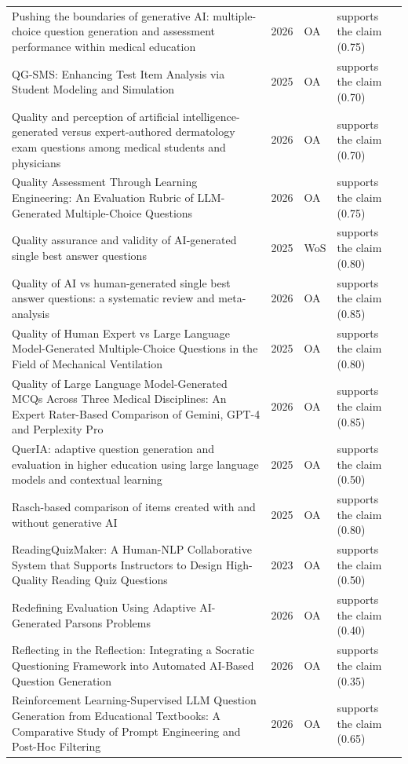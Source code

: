 \begin{longtable}{@{}%
  >{\raggedright\arraybackslash}p{}c%
  >{\raggedright\arraybackslash}p{}%
  >{\raggedright\arraybackslash}p{}@{}}
Pushing the boundaries of generative AI: multiple-choice question generation and assessment performance within medical education & 2026 & OA & supports the claim (0.75) \\
QG-SMS: Enhancing Test Item Analysis via Student Modeling and Simulation & 2025 & OA & supports the claim (0.70) \\
Quality and perception of artificial intelligence-generated versus expert-authored dermatology exam questions among medical students and physicians & 2026 & OA & supports the claim (0.70) \\
Quality Assessment Through Learning Engineering: An Evaluation Rubric of LLM-Generated Multiple-Choice Questions & 2026 & OA & supports the claim (0.75) \\
Quality assurance and validity of AI-generated single best answer questions & 2025 & WoS & supports the claim (0.80) \\
Quality of AI vs human-generated single best answer questions: a systematic review and meta-analysis & 2026 & OA & supports the claim (0.85) \\
Quality of Human Expert vs Large Language Model-Generated Multiple-Choice Questions in the Field of Mechanical Ventilation & 2025 & OA & supports the claim (0.80) \\
Quality of Large Language Model-Generated MCQs Across Three Medical Disciplines: An Expert Rater-Based Comparison of Gemini, GPT-4 and Perplexity Pro & 2026 & OA & supports the claim (0.85) \\
QuerIA: adaptive question generation and evaluation in higher education using large language models and contextual learning & 2025 & OA & supports the claim (0.50) \\
Rasch-based comparison of items created with and without generative AI & 2025 & OA & supports the claim (0.80) \\
ReadingQuizMaker: A Human-NLP Collaborative System that Supports Instructors to Design High-Quality Reading Quiz Questions & 2023 & OA & supports the claim (0.50) \\
Redefining Evaluation Using Adaptive AI-Generated Parsons Problems & 2026 & OA & supports the claim (0.40) \\
Reflecting in the Reflection: Integrating a Socratic Questioning Framework into Automated AI-Based Question Generation & 2026 & OA & supports the claim (0.35) \\
Reinforcement Learning-Supervised LLM Question Generation from Educational Textbooks: A Comparative Study of Prompt Engineering and Post-Hoc Filtering & 2026 & OA & supports the claim (0.65) \\

\end{longtable}
